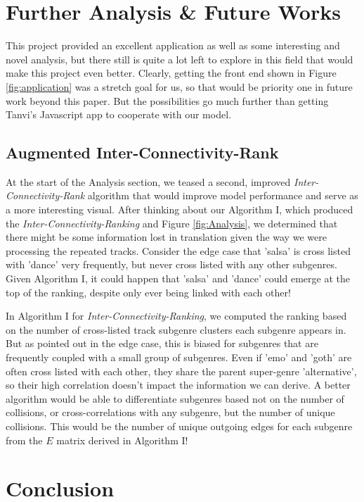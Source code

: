 \documentclass[conference]{IEEEtran}
\begin{document}
\section{Further Analysis \& Future Works}
This project provided an excellent application as well as some interesting and novel analysis, but there still is quite a lot left to explore in this field that would make this project even better. Clearly, getting the front end shown in Figure \ref{fig:application} was a stretch goal for us, so that would be priority one in future work beyond this paper. But the possibilities go much further than getting Tanvi's Javascript app to cooperate with our model. 

\subsection{Augmented Inter-Connectivity-Rank}
At the start of the Analysis section, we teased a second, improved \emph{Inter-Connectivity-Rank} algorithm that would improve model performance and serve as a more interesting visual. After thinking about our Algorithm I, which produced the \emph{Inter-Connectivity-Ranking} and Figure \ref{fig:Analysis}, we determined that there might be some information lost in translation given the way we were processing the repeated tracks. Consider the edge case that 'salsa' is cross listed with 'dance' very frequently, but never cross listed with any other subgenres. Given Algorithm I, it could happen that 'salsa' and 'dance' could emerge at the top of the ranking, despite only ever being linked with each other! 

In Algorithm I for \emph{Inter-Connectivity-Ranking}, we computed the ranking based on the number of cross-listed track subgenre clusters each subgenre appears in. But as pointed out in the edge case, this is biased for subgenres that are frequently coupled with a small group of subgenres. Even if 'emo' and 'goth' are often cross listed with each other, they share the parent super-genre 'alternative', so their high correlation doesn't impact the information we can derive. A better algorithm would be able to differentiate subgenres based not on the number of collisions, or cross-correlations with any subgenre, but the number of unique collisions. This would be the number of unique outgoing edges for each subgenre from the $E$ matrix derived in Algorithm I! 

\section{Conclusion}
\end{document}
